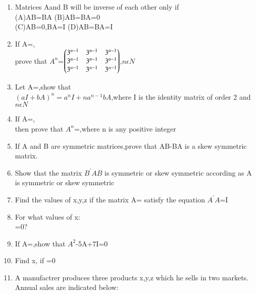 \begin{enumerate}[label=\arabic*.,ref=\thesubsection.\theenumi]
  \item Matrices Aand B will be inverse of each other only if\\
  (A)AB=BA (B)AB=BA=0\\
  (C)AB=0,BA=I (D)AB=BA=I\\
  
  \item If A=,\\prove that $A^{n}$=$\begin{pmatrix}3^{n-1} &3^{n-1}&3^{n-1}\\3^{n-1}&3^{n-1}&3^{n-1}\\3^{n-1}&3^{n-1} &3^{n-1}\end{pmatrix}$,$n \epsilon N$\\
  \item Let A=,show that \\$(aI+bA)^{n}=a^{n}I+na^{n-1}bA$,where I is the identity matrix of order 2 and $n \epsilon N$\\
  \item If A=,\\then prove that $A^{n}$=,where n is any positive integer\\
  \item If A and B are symmetric matrices,prove that AB-BA is a skew symmetric matrix.\\
  \item Show that the matrix $ B^{'}AB$ is symmetric or skew symmetric according as A is symmetric or skew symmetric\\
  
  \item Find the values of x,y,z if the matrix A= satisfy the equation $A^{'}A$=I\\
  \item For what values of x: \\=0?\\
  \item If A=,show that $A^{2}$-5A+7I=0\\
  \item Find x, if =0\\
  \item A manufactrer produces three products x,y,z which he sells in two markets. Annual sales are indicated below:\\
 

\end{enumerate}
